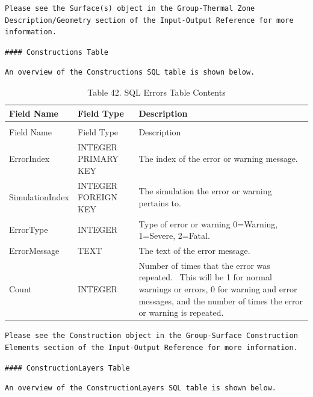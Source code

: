 \begin{lstlisting}
Please see the Surface(s) object in the Group-Thermal Zone Description/Geometry section of the Input-Output Reference for more information.
\end{lstlisting}

\begin{lstlisting}
#### Constructions Table
\end{lstlisting}

\begin{lstlisting}
An overview of the Constructions SQL table is shown below.
\end{lstlisting}

\begin{longtable}[c]{p{1.5in}p{1.5in}p{2.99in}}
\caption{Table 42. SQL Errors Table Contents \label{table:table-42.-sql-errors-table-contents}} \tabularnewline
\toprule 
Field Name & Field Type & Description \tabularnewline
\midrule
\endfirsthead

\caption[]{Table 42. SQL Errors Table Contents} \tabularnewline
\toprule 
Field Name & Field Type & Description \tabularnewline
\midrule
\endhead

ErrorIndex & INTEGER PRIMARY KEY & The index of the error or warning message. \tabularnewline
SimulationIndex & INTEGER FOREIGN KEY & The simulation the error or warning pertains to. \tabularnewline
ErrorType & INTEGER & Type of error or warning 0=Warning, 1=Severe, 2=Fatal. \tabularnewline
ErrorMessage & TEXT & The text of the error message. \tabularnewline
Count & INTEGER & Number of times that the error was repeated.~ This will be 1 for normal warnings or errors, 0 for warning and error messages, and the number of times the error or warning is repeated. \tabularnewline
\bottomrule
\end{longtable}

\begin{lstlisting}
Please see the Construction object in the Group-Surface Construction Elements section of the Input-Output Reference for more information.
\end{lstlisting}

\begin{lstlisting}
#### ConstructionLayers Table
\end{lstlisting}

\begin{lstlisting}
An overview of the ConstructionLayers SQL table is shown below.
\end{lstlisting}

